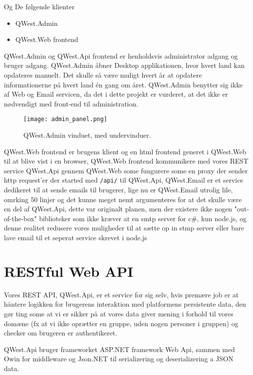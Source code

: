 Og De følgende klienter
\begin{itemize}\label{services}
    \item QWest.Admin
    \item QWest.Web frontend
\end{itemize}

QWest.Admin og QWest.Api frontend er henholdsvis administrator adgang og bruger adgang. QWest.Admin åbner Desktop applikationen, hvor hvert land kan opdateres manuelt. Det skulle så være muligt hvert år at opdatere informationerne på hvert land én gang om året. QWest.Admin benytter sig ikke af Web og Email servicen, da det i dette projekt er vurderet, at det ikke er nødvendigt med front-end til administration. 

\begin{figure}
    \texttt{[image: admin\_panel.png]}
    \caption{QWest.Admin vinduet, med undervinduer.}
    \label{fig:admin_panel}
\end{figure}

QWest.Web frontend er brugens klient og en html frontend generet i QWest.Web til at blive vist i en browser, QWest.Web frontend kommunikere med vores REST service QWest.Api gennem QWest.Web some fungurere some en proxy der sender http request'er der started med \texttt{/api/} til QWest.Api, QWest.Email er et service dedikeret til at sende emails til brugerer, lige nu er QWest.Email utrolig lile, omrking 50 linjer og det kunne meget nemt argumenteres for at det skulle være en del af QWest.Api, dette var originalt planen, men der existere ikke nogen "out-of-the-box" biblioteker som ikke kræver at en smtp server for c\#, kun node.js, og denne realitet redusere vores muligheder til at sætte op in stmp server eller bare lave email til et seperat service skrevet i node.js


\section{RESTful Web API}\label{sec:REST}
Vores REST API, QWest.Api, er et service for sig selv, hvis premære job er at håntere logikken for brugerens interaktion med platformens persistente data, den gør ting some at vi er sikker på at vores data giver mening i forhold til vores domæne (fx at vi ikke oprætter en gruppe, uden nogen personer i gruppen) og checker om brugeren er authentikeret.

QWest.Api bruger frameworket ASP.NET framework Web Api, sammen med Owin for middleware og Json.NET til serializering og deserializering a JSON data.

